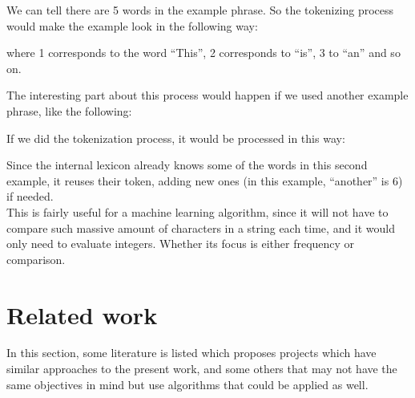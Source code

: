\documentclass[review]{elsarticle} %
\begin{document}
We can tell there are 5 words in the example phrase. So the tokenizing process would make the example look in the following way:
\begin{center}
\end{center}

\noindent where 1 corresponds to the word ``This'', 2 corresponds to ``is'', 3 to ``an'' and so on.

The interesting part about this process would happen if we used another example phrase, like the following:
\begin{center}
\end{center}

If we did the tokenization process, it would be processed in this way:
\begin{center}
\end{center}

Since the internal lexicon already knows some of the words in this second example, it reuses their token, adding new ones (in this example, ``another'' is 6) if needed.\\

This is fairly useful for a machine learning algorithm, since it will not have to compare such massive amount of characters in a string each time, and it would only need to evaluate integers. Whether its focus is either frequency or comparison.

\section{Related work}
In this section, some literature is listed which proposes projects which have similar approaches to the present work, and some others that may not have the same objectives in mind but use algorithms that could be applied as well.
\end{document}
